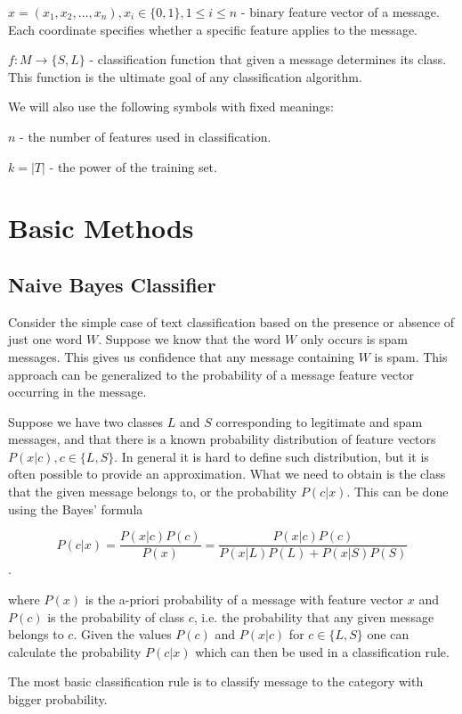 \documentclass[12pt]{report}
\begin{document}
$x = (x_1, x_2, \dots, x_n), x_i \in \{0, 1\}, 1 \leq i \leq n$ - binary feature vector of a message. Each coordinate specifies whether a specific feature applies to the message.

$f : M \rightarrow \{S, L\}$ - classification function that given a message determines its class. This function is the ultimate goal of any classification algorithm.

We will also use the following symbols with fixed meanings:

$n$ - the number of features used in classification.

$k = |T|$ - the power of the training set.

\newpage


\chapter{Basic Methods}

\section{Naive Bayes Classifier}

Consider the simple case of text classification based on the presence or absence of just one word $W$. Suppose we know that the word $W$ only occurs is spam messages. This gives us confidence that any message containing $W$ is spam. This approach can be generalized to the probability of a message feature vector occurring in the message.

Suppose we have two classes $L$ and $S$ corresponding to legitimate and spam messages, and that there is a known probability distribution of feature vectors $P(x | c), c \in \{L, S\}$. In general it is hard to define such distribution, but it is often possible to provide an approximation. What we need to obtain is the class that the given message belongs to, or the probability $P(c | x)$. This can be done using the Bayes' formula

$$P(c | x) = \dfrac{P(x | c) P(c)}{P(x)} = \dfrac{P(x | c) P(c)}{P(x | L) P(L) + P(x | S) P(S)}$$.

where $P(x)$ is the a-priori probability of a message with feature vector $x$ and $P(c)$ is the probability of class $c$, i.e. the probability that any given message belongs to $c$. Given the values $P(c)$ and $P(x | c)$ for $c \in \{L, S\}$ one can calculate the probability $P(c | x)$ which can then be used in a classification rule.

The most basic classification rule is to classify message to the category with bigger probability.
\end{document}
